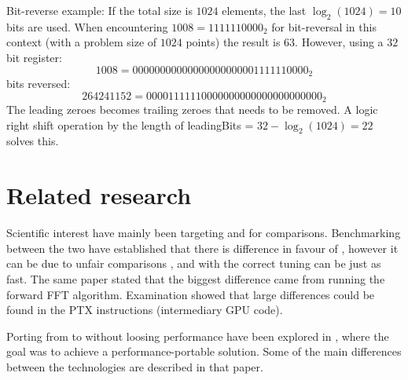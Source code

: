 Bit-reverse example: If the total size is $1024$ elements, the last $\log_{2}(1024) = 10$ bits are used. When encountering $1008 = 1111110000_{2}$ for bit-reversal in this context (with a problem size of $1024$ points) the result is $63$. However, using a $32$ bit register:
\begin{equation}
	1008 = 00000000000000000000001111110000_{2}
\end{equation}
bits reversed:
\begin{equation}
	264241152 = 00001111110000000000000000000000_{2} 
\end{equation}
The leading zeroes becomes trailing zeroes that needs to be removed. A logic right shift operation by the length of leadingBits = $32 - \log_{2}(1024) = 22$ solves this.

\section{Related research}

Scientific interest have mainly been targeting {\CU} and {\OCL} for comparisons. Benchmarking between the two have established that there is difference in favour of {\CU}, however it can be due to unfair comparisons \cite{fang2011comprehensive}, and with the correct tuning {\OCL} can be just as fast. The same paper stated that the biggest difference came from running the forward \gls{FFT} algorithm. Examination showed that large differences could be found in the \gls{PTX} instructions (intermediary \gls{GPU} code).

Porting from {\CU} to {\OCL} without loosing performance have been explored in \cite{du2012cuda}, where the goal was to achieve a performance-portable solution. Some of the main differences between the technologies are described in that paper.